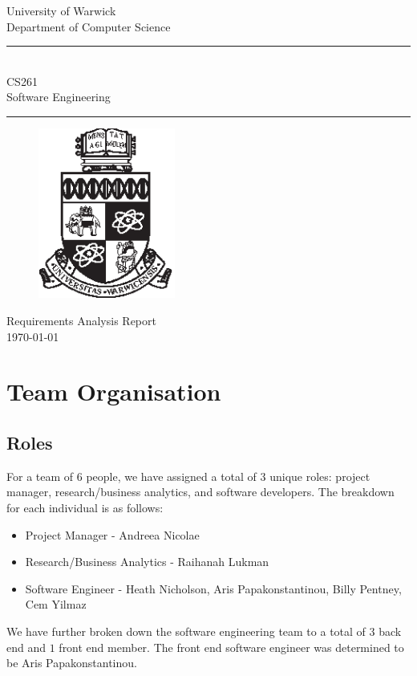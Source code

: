 \documentclass[a4paper]{article}
\theoremstyle{plain}
\theoremstyle{definition}
\theoremstyle{remark}
\begin{document}
\begin{titlepage}
\begin{center}
\large
University of Warwick \\
Department of Computer Science \\
\huge
\vspace{50mm}
\rule{\linewidth}{0.5pt} \\
CS261 \\
\vspace{5mm}
\Large
Software Engineering
\rule{\linewidth}{0.5pt}
\vspace{5mm}
\begin{figure}[H]
\centering
\includegraphics[width=0.4\textwidth]{crest_black.eps}
\end{figure}
\vspace{37mm}
Requirements Analysis Report \\
\today
\end{center}
\end{titlepage}
\newpage
\tableofcontents
\newpage
\section{Team Organisation}
\subsection{Roles}
For a team of $6$ people, we have assigned a total of $3$ unique roles: project manager, research/business analytics, and software developers. The breakdown for each individual is as follows:
\begin{itemize}
	\item  Project Manager - Andreea Nicolae
	\item Research/Business Analytics - Raihanah Lukman
	\item Software Engineer - Heath Nicholson, Aris Papakonstantinou, Billy Pentney, Cem Yilmaz
\end{itemize}
We have further broken down the software engineering team to a total of $3$ back end and $1$ front end member. The front end software engineer was determined to be Aris Papakonstantinou.
\end{document}
